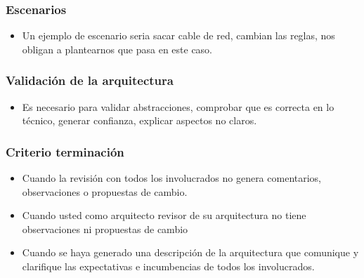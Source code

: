 \subsubsection*{Escenarios}
\begin{itemize}
\item Un ejemplo de escenario seria sacar cable de red, cambian las reglas, nos obligan a plantearnos que pasa en este caso.
\end{itemize}


\subsubsection*{Validación de la arquitectura}
\begin{itemize}
\item Es necesario para validar abstracciones, comprobar que es correcta en lo técnico, generar confianza, explicar aspectos no claros.
\end{itemize}


\subsubsection*{Criterio terminación}
\begin{itemize}
\item Cuando la revisión con todos los involucrados no genera comentarios, observaciones o propuestas de cambio.
\item Cuando usted como arquitecto revisor de su arquitectura no tiene observaciones ni propuestas de cambio
\item Cuando se haya generado una descripción de la arquitectura que comunique y clarifique las expectativas e incumbencias de todos los involucrados.
\end{itemize}


